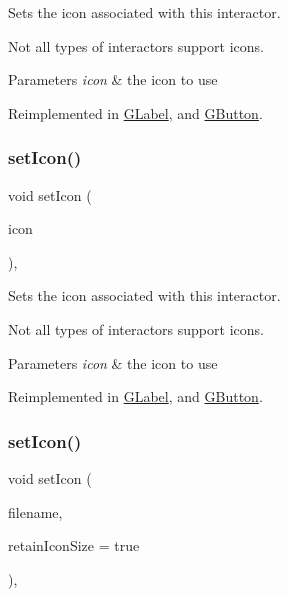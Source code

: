 Sets the icon associated with this interactor. 

Not all types of interactors support icons. 
\begin{DoxyParams}{Parameters}
{\em icon} & the icon to use \\
\hline
\end{DoxyParams}


Reimplemented in \mbox{\hyperlink{classsgl_1_1GLabel_acca97b6c6330abded1c80521c9aca3a6}{G\+Label}}, and \mbox{\hyperlink{classsgl_1_1GButton_acca97b6c6330abded1c80521c9aca3a6}{G\+Button}}.

\mbox{\label{classsgl_1_1GInteractor_a368e1a338f84401c284506d03b1ba769}} 
\subsubsection{\texorpdfstring{set\+Icon()}{setIcon()}\hspace{0.1cm}{\footnotesize\ttfamily [2/3]}}
{\footnotesize\ttfamily void set\+Icon (\begin{DoxyParamCaption}\item[{const Q\+Pixmap \&}]{icon }\end{DoxyParamCaption})\hspace{0.3cm}{\ttfamily [virtual]}, {\ttfamily [inherited]}}



Sets the icon associated with this interactor. 

Not all types of interactors support icons. 
\begin{DoxyParams}{Parameters}
{\em icon} & the icon to use \\
\hline
\end{DoxyParams}


Reimplemented in \mbox{\hyperlink{classsgl_1_1GLabel_acb5275b880ff622d306f8f33428b4e34}{G\+Label}}, and \mbox{\hyperlink{classsgl_1_1GButton_acb5275b880ff622d306f8f33428b4e34}{G\+Button}}.

\mbox{\label{classsgl_1_1GInteractor_a762e139aa311461c3984d3ad28293f64}} 
\subsubsection{\texorpdfstring{set\+Icon()}{setIcon()}\hspace{0.1cm}{\footnotesize\ttfamily [3/3]}}
{\footnotesize\ttfamily void set\+Icon (\begin{DoxyParamCaption}\item[{const std\+::string \&}]{filename,  }\item[{bool}]{retain\+Icon\+Size = {\ttfamily true} }\end{DoxyParamCaption})\hspace{0.3cm}{\ttfamily [virtual]}, {\ttfamily [inherited]}}



